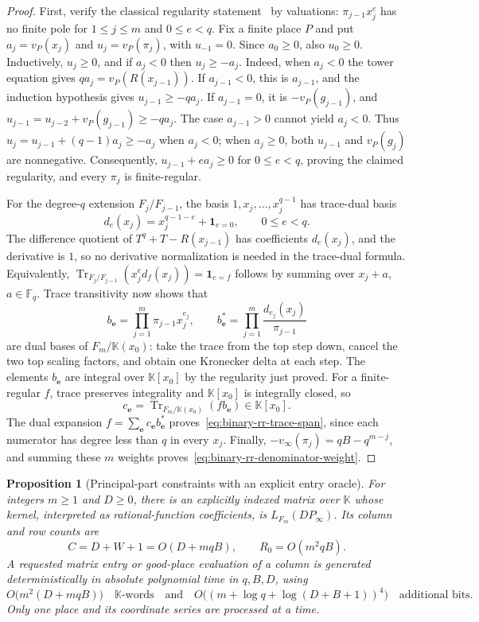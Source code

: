 \documentclass[11pt,letterpaper]{article}
\newtheorem{proposition}[theorem]{Proposition}
\numberwithin{equation}{section}
\begin{document}
\begin{proof}
First, verify the classical regularity statement~\cite[Lemma~3.4]{PellikaanStichtenothTorres1998Semigroups} by valuations: $\pi_{j-1}x_j^e$ has no finite pole for $1\leq j\leq m$ and $0\leq e<q$.
Fix a finite place $P$ and put $a_j=v_P(x_j)$ and $u_j=v_P(\pi_j)$, with $u_{-1}=0$.
Since $a_0\geq0$, also $u_0\geq0$.
Inductively, $u_j\geq0$, and if $a_j<0$ then $u_j\geq-a_j$.
Indeed, when $a_j<0$ the tower equation gives $qa_j=v_P(R(x_{j-1}))$.
If $a_{j-1}<0$, this is $a_{j-1}$, and the induction hypothesis gives $u_{j-1}\geq-qa_j$.
If $a_{j-1}=0$, it is $-v_P(g_{j-1})$, and $u_{j-1}=u_{j-2}+v_P(g_{j-1})\geq-qa_j$.
The case $a_{j-1}>0$ cannot yield $a_j<0$.
Thus $u_j=u_{j-1}+(q-1)a_j\geq-a_j$ when $a_j<0$; when $a_j\geq0$, both $u_{j-1}$ and $v_P(g_j)$ are nonnegative.
Consequently, $u_{j-1}+ea_j\geq0$ for $0\leq e<q$, proving the claimed regularity, and every $\pi_j$ is finite-regular.

For the degree-$q$ extension $F_j/F_{j-1}$, the basis $1,x_j,\ldots,x_j^{q-1}$ has trace-dual basis
\[
 d_e(x_j)=x_j^{q-1-e}+\boldsymbol1_{e=0},\qquad0\leq e<q.
\]
The difference quotient of $T^q+T-R(x_{j-1})$ has coefficients $d_e(x_j)$, and the derivative is $1$, so no derivative normalization is needed in the trace-dual formula.
Equivalently, $\operatorname{Tr}_{F_j/F_{j-1}}(x_j^e d_f(x_j))= \boldsymbol1_{e=f}$ follows by summing over $x_j+a$, $a\in\mathbb F_q$.
Trace transitivity now shows that
\[
 b_{\boldsymbol e}=\prod_{j=1}^m\pi_{j-1}x_j^{e_j},\qquad
 b^*_{\boldsymbol e}=\prod_{j=1}^m
              \frac{d_{e_j}(x_j)}{\pi_{j-1}}
\]
are dual bases of $F_m/\mathbb K(x_0)$: take the trace from the top step down, cancel the two top scaling factors, and obtain one Kronecker delta at each step.
The elements $b_{\boldsymbol e}$ are integral over $\mathbb K[x_0]$ by the regularity just proved.
For a finite-regular $f$, trace preserves integrality and $\mathbb K[x_0]$ is integrally closed, so
\[
 c_{\boldsymbol e}=
 \operatorname{Tr}_{F_m/\mathbb K(x_0)}(f b_{\boldsymbol e})\in \mathbb K[x_0].
\]
The dual expansion $f=\sum_{\boldsymbol e}c_{\boldsymbol e} b^*_{\boldsymbol e}$ proves~\eqref{eq:binary-rr-trace-span}, since each numerator has degree less than $q$ in every $x_j$.
Finally, $-v_\infty(\pi_j)=qB-q^{m-j}$, and summing these $m$ weights proves~\eqref{eq:binary-rr-denominator-weight}.
\end{proof}

\begin{proposition}[Principal-part constraints with an explicit entry oracle]
\label{prop:binary-rr-entry-oracle}
For integers $m\geq1$ and $D\geq0$, there is an explicitly indexed matrix over $\mathbb K$ whose kernel, interpreted as rational-function coefficients, is $L_{F_m}(DP_\infty)$.
Its column and row counts are
\[
 C=D+W+1=O(D+mqB),\qquad R_0=O(m^2qB).
\]
A requested matrix entry or good-place evaluation of a column is generated deterministically in absolute polynomial time in $q,B,D$, using
\[
 O\bigl(m^2(D+mqB)\bigr)\quad \mathbb K\text{-words}
 \quad\text{and}\quad
 O\bigl((m+\log q+\log(D+B+1))^4\bigr)\quad\text{additional bits}.
\]
Only one place and its coordinate series are processed at a time.
\end{proposition}
\end{document}
